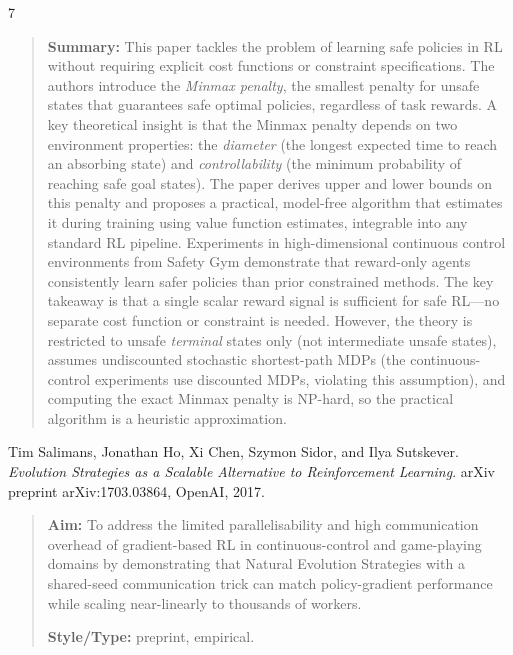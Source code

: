 \documentclass[12pt, a4paper]{article}
\begin{document}
\begin{thebibliography}{7}
\begin{quotation}
\textbf{Summary:} This paper tackles the problem of learning safe policies in RL without requiring explicit cost functions or constraint specifications. The authors introduce the \textit{Minmax penalty}, the smallest penalty for unsafe states that guarantees safe optimal policies, regardless of task rewards. A key theoretical insight is that the Minmax penalty depends on two environment properties: the \textit{diameter} (the longest expected time to reach an absorbing state) and \textit{controllability} (the minimum probability of reaching safe goal states). The paper derives upper and lower bounds on this penalty and proposes a practical, model-free algorithm that estimates it during training using value function estimates, integrable into any standard RL pipeline. Experiments in high-dimensional continuous control environments from Safety Gym demonstrate that reward-only agents consistently learn safer policies than prior constrained methods. The key takeaway is that a single scalar reward signal is sufficient for safe RL---no separate cost function or constraint is needed. However, the theory is restricted to unsafe \emph{terminal} states only (not intermediate unsafe states), assumes undiscounted stochastic shortest-path MDPs (the continuous-control experiments use discounted MDPs, violating this assumption), and computing the exact Minmax penalty is NP-hard, so the practical algorithm is a heuristic approximation.
\end{quotation}

Tim Salimans, Jonathan Ho, Xi Chen, Szymon Sidor, and Ilya Sutskever.
\textit{Evolution Strategies as a Scalable Alternative to Reinforcement Learning}.
arXiv preprint arXiv:1703.03864, OpenAI, 2017.

\begin{quotation}
\noindent
\textbf{Aim:} To address the limited parallelisability and high communication overhead of gradient-based RL in continuous-control and game-playing domains by demonstrating that Natural Evolution Strategies with a shared-seed communication trick can match policy-gradient performance while scaling near-linearly to thousands of workers.

\textbf{Style/Type:} preprint, empirical.


\end{quotation}
\end{thebibliography}
\end{document}
